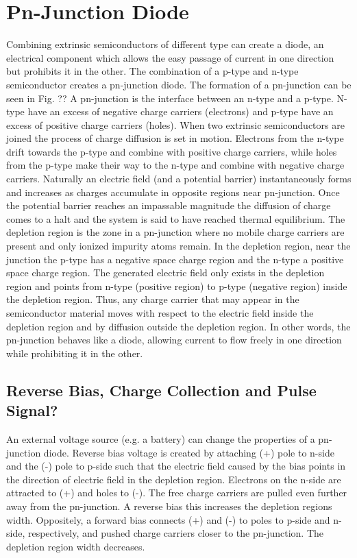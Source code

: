 \section{Pn-Junction Diode}
Combining extrinsic semiconductors of different type can create a diode, an electrical component which allows the easy passage of current in one direction but prohibits it in the other. The combination of a p-type and n-type semiconductor creates a pn-junction diode. The formation of a pn-junction can be seen in Fig. ??
A pn-junction is the interface between an n-type and a p-type. N-type have an excess of negative charge carriers (electrons) and p-type have an excess of positive charge carriers (holes). When two extrinsic semiconductors are joined the process of charge diffusion is set in motion. Electrons from the n-type drift towards the p-type and combine with positive charge carriers, while holes from the p-type make their way to the n-type and combine with negative charge carriers. Naturally an electric field (and a potential barrier) instantaneously forms and increases as charges accumulate in opposite regions near pn-junction. Once the potential barrier reaches an impassable magnitude the diffusion of charge comes to a halt and the system is said to have reached thermal equilibrium. The depletion region is the zone in a pn-junction where no mobile charge carriers are present and only ionized impurity atoms remain. In the depletion region, near the junction the p-type has a negative space charge region and the n-type a positive space charge region. The generated electric field only exists in the depletion region and points from n-type (positive region) to p-type (negative region) inside the depletion region. Thus, any charge carrier that may appear in the semiconductor material moves with respect to the electric field inside the depletion region and by diffusion outside the depletion region. In other words, the pn-junction behaves like a diode, allowing current to flow freely in one direction while prohibiting it in the other.

\subsection{Reverse Bias, Charge Collection and Pulse Signal?} %
An external voltage source (e.g. a battery) can change the properties of a pn-junction diode. Reverse bias voltage is created by attaching (+) pole to n-side and the (-) pole to p-side such that the electric field caused by the bias points in the direction of electric field in the depletion region.  Electrons on the n-side are attracted to (+) and holes to (-). The free charge carriers are pulled even further away from the pn-junction. A reverse bias this increases the depletion regions width.
Oppositely, a forward bias connects (+) and (-) to poles to p-side and n-side, respectively, and pushed charge carriers closer to the pn-junction. The depletion region width decreases.

